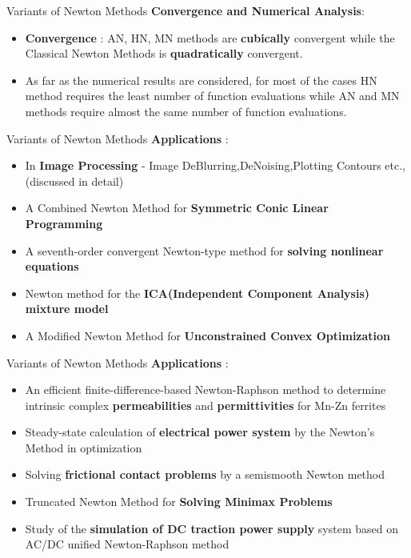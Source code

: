 \documentclass[10pt]{beamer}
\begin{document}
\begin{frame}[fragile]{Variants of Newton Methods}
  \textbf{Convergence and Numerical Analysis}:
  \begin{itemize}
    \item \textbf{Convergence} : AN, HN, MN methods are \textbf{cubically} convergent while the Classical Newton Methods is \textbf{quadratically} convergent.  
     \item As far as the numerical results are considered, for most of the cases HN method requires the least number of function evaluations while AN and MN methods require almost the same number of function evaluations. 
    
   \end{itemize}
\end{frame}
\begin{frame}{Variants of Newton Methods}
\textbf{Applications} :
 \begin{itemize}
    \item In \textbf{Image Processing} - Image DeBlurring,DeNoising,Plotting Contours etc.,(discussed in detail)
     \item A Combined Newton Method for \textbf{Symmetric Conic Linear Programming}

\item A seventh-order convergent Newton-type method for \textbf{solving nonlinear equations}
\item Newton method for the \textbf{ICA(Independent Component Analysis) mixture model}
\item A Modified Newton Method for \textbf{Unconstrained Convex Optimization}


   \end{itemize}
\end{frame}

\begin{frame}{Variants of Newton Methods}
\textbf{Applications} :
 \begin{itemize}
    
\item An efficient finite-difference-based Newton-Raphson method to determine intrinsic complex \textbf{permeabilities} and \textbf{permittivities} for Mn-Zn ferrites

\item Steady-state calculation of \textbf{electrical power system} by the Newton's Method in optimization

\item Solving \textbf{frictional contact problems} by a semismooth Newton method

\item Truncated Newton Method for \textbf{Solving Minimax Problems}

\item Study of the \textbf{simulation of DC traction power supply} system based on AC/DC unified Newton-Raphson method
     
   \end{itemize}
\end{frame}
\end{document}
